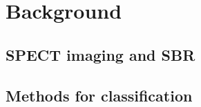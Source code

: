 \section{Background}
\label{sec:background}

\subsection{SPECT imaging and SBR}
\label{subsec:somesubsec}

\subsection{Methods for classification}
\label{subsec:randfors}


